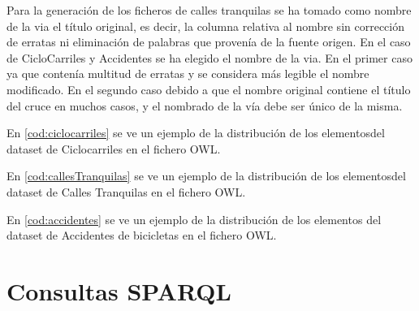 Para la generación de los ficheros de calles tranquilas se ha tomado como nombre de la via el título original, es decir, la columna relativa al nombre sin corrección de erratas ni eliminación de palabras que provenía de la fuente origen. En el caso de CicloCarriles y Accidentes se ha elegido el nombre de la via. En el primer caso ya que contenía multitud de erratas y se considera más legible el nombre modificado. En el segundo caso debido a que el nombre original contiene el título del cruce en muchos casos, y el nombrado de la vía debe ser único de la misma.

En \ref{cod:ciclocarriles} se ve un ejemplo de la distribución de los elementosdel dataset de Ciclocarriles en el fichero OWL.




En \ref{cod:callesTranquilas} se ve un ejemplo de la distribución de los elementosdel dataset de Calles Tranquilas en el fichero OWL.




En \ref{cod:accidentes} se ve un ejemplo de la distribución de los elementos del dataset de Accidentes de bicicletas en el fichero OWL.




\section{Consultas SPARQL}


